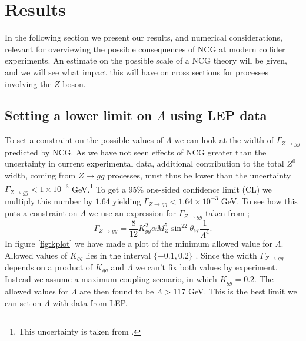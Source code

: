 \section{Results}
In the following section we present our results, and numerical considerations, relevant for overviewing the possible consequences of NCG at modern collider experiments. An estimate on the possible scale of a NCG theory will be given, and we will see what impact this will have on cross sections for processes involving the $Z$ boson.

\subsection{Setting a lower limit on $\Lambda$ using LEP data}
To set a constraint on the possible values of $\Lambda$ we can look at the width of $\Gamma_{Z \rightarrow gg}$ predicted by NCG. As we have not seen effects of NCG greater than the uncertainty in current experimental data, additional contribution to the total $Z^0$ width, coming from $Z \rightarrow gg$ processes, must thus be lower than the uncertainty $\Gamma_{Z \rightarrow gg} < 1 \times 10^{-3}$ GeV.\footnote{This uncertainty is taken from \cite{behr2003dnc}.} To get a 95\% one-sided confidence limit (CL) we multiply this number by $1.64$ \cite{amsler2008rpp} yielding $\Gamma_{Z \rightarrow gg} < 1.64 \times 10^{-3}$ GeV. To see how this puts a constraint on $\Lambda$ we use an expression for $\Gamma_{Z \rightarrow gg}$ taken from \cite{behr2003dnc};
\begin{equation} \label{eq:zggwidth}
	\Gamma_{Z \rightarrow gg} = \frac{8}{12} K_{gg}^2 \alpha M_Z^5 \sin^22\theta_W \frac{1}{\Lambda^4}.
\end{equation}
In figure \ref{fig:kplot} we have made a plot of the minimum allowed value for $\Lambda$. Allowed values of $K_{gg}$ lies in the interval $\{-0.1,0.2\}$ \cite{behr2003dnc}. Since the width $\Gamma_{Z \rightarrow gg}$ depends on a product of $K_{gg}$ and $\Lambda$ we can't fix both values by experiment. Instead we assume a maximum coupling scenario, in which $K_{gg}=0.2$. The allowed values for $\Lambda$ are then found to be $\Lambda >117$ GeV. This is the best limit we can set on $\Lambda$ with data from LEP.


